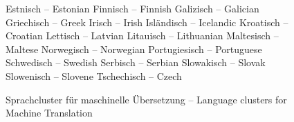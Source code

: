 \documentclass[]{../../metanetpaper}
\begin{document}
\begin{Parallel}[c]{79mm}{78mm}
\begin{figure}
\begin{tabular}
Estnisch -- \textcolor{grey3}{Estonian} \newline 
Finnisch -- \textcolor{grey3}{Finnish} \newline 
Galizisch -- \textcolor{grey3}{Galician} \newline 
Griechisch -- \textcolor{grey3}{Greek} \newline 
Irisch -- \textcolor{grey3}{Irish} \newline 
Isländisch -- \textcolor{grey3}{Icelandic} \newline 
Kroatisch -- \textcolor{grey3}{Croatian} \newline 
Lettisch -- \textcolor{grey3}{Latvian} \newline 
Litauisch -- \textcolor{grey3}{Lithuanian} \newline 
Maltesisch -- \textcolor{grey3}{Maltese} \newline 
Norwegisch -- \textcolor{grey3}{Norwegian} \newline 
Portugiesisch -- \textcolor{grey3}{Portuguese} \newline 
Schwedisch -- \textcolor{grey3}{Swedish} \newline 
Serbisch -- \textcolor{grey3}{Serbian} \newline 
Slowakisch -- \textcolor{grey3}{Slovak} \newline 
Slowenisch -- \textcolor{grey3}{Slovene} \newline 
Tschechisch -- \textcolor{grey3}{Czech} \\
\end{tabular}
\label{fig:mt_cluster}
\caption{Sprachcluster für maschinelle Übersetzung -- \textcolor{grey3}{Language clusters for Machine Translation}}
\end{figure}


\end{Parallel}
\end{document}

